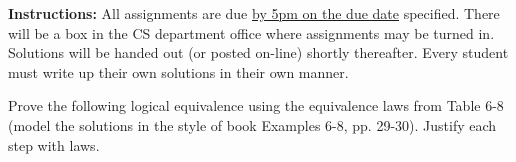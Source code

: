 \documentclass[10pt,addpoints]{exam}
\newcommand{\ra}{\rightarrow}
\begin{document}
\extrawidth{0.5in} \extrafootheight{-0in} \pagestyle{headandfoot}
\headrule 
{} \footrule 
{}

\noindent \textbf{Instructions:} All assignments are due \underline{by 5pm on the due date} specified.  There will be a box in the CS department office where assignments may be turned in.  Solutions will be handed out (or posted on-line) shortly thereafter.  Every student
must write up their own solutions in their own manner.


\begin{questions}
\printanswers


\question Prove the following logical equivalence using the
equivalence laws from Table 6-8 (model the solutions in the style of
book Examples 6-8, pp. 29-30).  Justify each step with laws.
    \ifprintanswers
        \vspace{-10pt}
    \fi
    \begin{solution}
    \small
\end{solution}
\end{questions}
\end{document}
